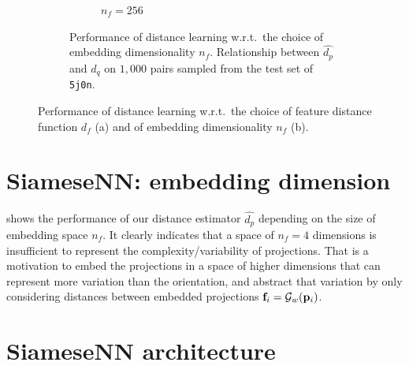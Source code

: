 \begin{figure}[ht]
\begin{subfigure}[b]{0.48\linewidth}
\begin{subfigure}[t]{0.48\linewidth}
            \caption*{$n_f=256$} %
        \end{subfigure}
        \caption{%
            Performance of distance learning w.r.t.\ the choice of embedding dimensionality $n_f$.
            Relationship between $\widehat{d_p}$ and $d_q$ on $1,000$ pairs sampled from the test set of \texttt{5j0n}.
        }\label{fig:4d-vs-256d-de}
    \end{subfigure}
        \caption{%
            Performance of distance learning w.r.t.\ the choice of feature distance function $d_f$ (a) and of embedding dimensionality $n_f$ (b).
        }
\end{figure}

\section{SiameseNN: embedding dimension}\label{apx:siamese:embedding-dimension}

 shows the performance of our distance estimator $\widehat{d_p}$ depending on the size of embedding space $n_f$.
It clearly indicates that a space of $n_f=4$ dimensions is insufficient to represent the complexity/variability of projections.
That is a motivation to embed the projections in a space of higher dimensions that can represent more variation than the orientation, and abstract that variation by only considering distances between embedded projections $\mathbf{f}_i = \mathcal{G}_w(\mathbf{p}_i)$.


\section{SiameseNN architecture}\label{apx:siamese-architecture}


